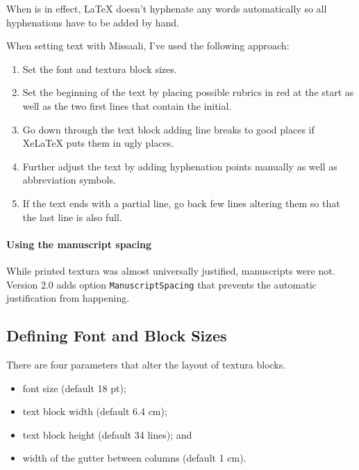 \documentclass[a4paper, 12pt]{article}
\newcommand{\feature}[1]{\texttt{#1}}
\begin{document}
When  is in effect, LaTeX doesn't hyphenate any
words automatically so all hyphenations have to be added by hand. 

When setting text with Missaali, I've used the following approach:

\begin{enumerate}
\item Set the font and textura block sizes.

\item Set the beginning of the text by placing possible rubrics in red
  at the start as well as the two first lines that contain the
  initial. 

\item Go down through the text block adding line breaks to good places
  if XeLaTeX puts them in ugly places.

\item Further adjust the text by adding hyphenation points manually as
  well as abbreviation symbols. 

\item If the text ends with a partial line, go back few lines altering
  them so that the last line is also full. 
\end{enumerate}

\paragraph{Using the manuscript spacing}

While printed textura was almost universally justified, manuscripts
were not. Version 2.0 adds option \feature{ManuscriptSpacing} that
prevents the automatic justification from happening. 


\subsection{Defining Font and Block Sizes}

There are four parameters that alter the layout of textura blocks.

\begin{itemize}
\item font size (default 18 pt);  
\item text block width (default 6.4 cm);
\item text block height (default 34 lines); and 
\item width of the gutter between columns (default 1 cm). 
\end{itemize}
\end{document}
